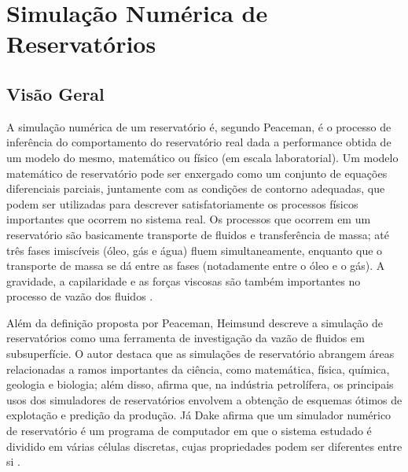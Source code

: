 
\section{Simula\c{c}\~{a}o Num\'{e}rica de Reservat\'{o}rios}
\subsection{Vis\~{a}o Geral}
A simula\c{c}\~{a}o num\'{e}rica de um reservat\'{o}rio \'{e}, segundo Peaceman, \'{e} o processo de infer\^{e}ncia do comportamento do reservat\'{o}rio real dada a performance obtida de um modelo do mesmo, matem\'{a}tico ou f\'{i}sico (em escala laboratorial). Um modelo matem\'{a}tico de reservat\'{o}rio pode ser enxergado como um conjunto de equa\c{c}\~{o}es diferenciais parciais, juntamente com as condi\c{c}\~{o}es de contorno adequadas, que podem ser utilizadas para descrever satisfatoriamente os processos f\'{i}sicos importantes que ocorrem no sistema real. Os processos que ocorrem em um reservat\'{o}rio s\~{a}o basicamente transporte de fluidos e transfer\^{e}ncia de massa; at\'{e} tr\^{e}s fases imisc\'{i}veis (\'{o}leo, g\'{a}s e \'{a}gua) fluem simultaneamente, enquanto que o transporte de massa se d\'{a} entre as fases (notadamente entre o \'{o}leo e o g\'{a}s). A gravidade, a capilaridade e as for\c{c}as viscosas s\~{a}o tamb\'{e}m importantes no processo de vaz\~{a}o dos fluidos \cite{simres}.

Al\'{e}m da defini\c{c}\~{a}o proposta por Peaceman, Heimsund descreve a simula\c{c}\~{a}o de reservat\'{o}rios como uma ferramenta de investiga\c{c}\~{a}o da vaz\~{a}o de fluidos em subsuperf\'{i}cie. O autor destaca que as simula\c{c}\~{o}es de reservat\'{o}rio abrangem \'{a}reas relacionadas a ramos importantes da ci\^{e}ncia, como matem\'{a}tica, f\'{i}sica, qu\'{i}mica, geologia e biologia; al\'{e}m disso, afirma que, na ind\'{u}stria petrol\'{i}fera, os principais usos dos simuladores de reservat\'{o}rios envolvem a obten\c{c}\~{a}o de esquemas \'{o}timos de explota\c{c}\~{a}o e predi\c{c}\~{a}o da produ\c{c}\~{a}o\cite{heimsund2005}. J\'{a} Dake afirma que um simulador num\'{e}rico de reservat\'{o}rio \'{e} um programa de computador em que o sistema estudado \'{e} dividido em v\'{a}rias c\'{e}lulas discretas, cujas propriedades podem ser diferentes entre si \cite{dake}.

